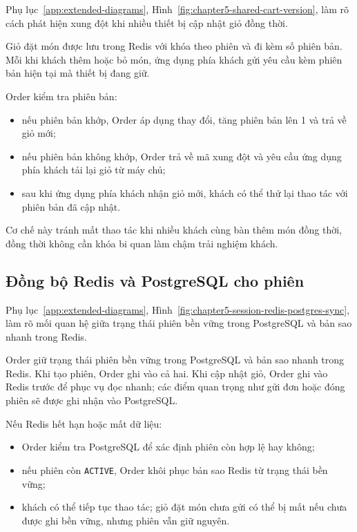 Phụ lục~\ref{app:extended-diagrams}, Hình~\ref{fig:chapter5-shared-cart-version}, làm rõ cách phát hiện xung đột khi nhiều thiết bị cập nhật giỏ đồng thời.

Giỏ đặt món được lưu trong Redis với khóa theo phiên và đi kèm số phiên bản. Mỗi khi khách thêm hoặc bỏ món, ứng dụng phía khách gửi yêu cầu kèm phiên bản hiện tại mà thiết bị đang giữ.

Order kiểm tra phiên bản:

\begin{itemize}
  \item nếu phiên bản khớp, Order áp dụng thay đổi, tăng phiên bản lên 1 và trả về giỏ mới;
  \item nếu phiên bản không khớp, Order trả về mã xung đột và yêu cầu ứng dụng phía khách tải lại giỏ từ máy chủ;
  \item sau khi ứng dụng phía khách nhận giỏ mới, khách có thể thử lại thao tác với phiên bản đã cập nhật.
\end{itemize}

Cơ chế này tránh mất thao tác khi nhiều khách cùng bàn thêm món đồng thời, đồng thời không cần khóa bi quan làm chậm trải nghiệm khách.

\subsection{Đồng bộ Redis và PostgreSQL cho phiên}

Phụ lục~\ref{app:extended-diagrams}, Hình~\ref{fig:chapter5-session-redis-postgres-sync}, làm rõ mối quan hệ giữa trạng thái phiên bền vững trong PostgreSQL và bản sao nhanh trong Redis.

Order giữ trạng thái phiên bền vững trong PostgreSQL và bản sao nhanh trong Redis. Khi tạo phiên, Order ghi vào cả hai. Khi cập nhật giỏ, Order ghi vào Redis trước để phục vụ đọc nhanh; các điểm quan trọng như gửi đơn hoặc đóng phiên sẽ được ghi nhận vào PostgreSQL.

Nếu Redis hết hạn hoặc mất dữ liệu:

\begin{itemize}
  \item Order kiểm tra PostgreSQL để xác định phiên còn hợp lệ hay không;
  \item nếu phiên còn \texttt{ACTIVE}, Order khôi phục bản sao Redis từ trạng thái bền vững;
  \item khách có thể tiếp tục thao tác; giỏ đặt món chưa gửi có thể bị mất nếu chưa được ghi bền vững, nhưng phiên vẫn giữ nguyên.
\end{itemize}

